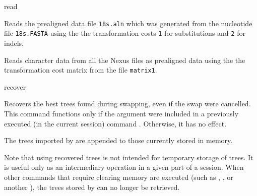 \begin{command}{read}{}
\begin{poyexamples}
{Reads the prealigned data file \texttt{18s.aln} which was generated from the nucleotide file \texttt{18s.FASTA}
using the the transformation costs \texttt{1} for substitutions and \texttt{2} for indels.}

{Reads character data from all the Nexus files as prealigned data using the the transformation cost
matrix from the file \texttt{matrix1}.}

\end{poyexamples}

\begin{poyalso}
\end{poyalso}

\end{command}


\begin{command}{recover}{}
\syntax{\obligatory{()}}

\begin{poydescription}
Recovers the best trees found during swapping, even if the swap were
cancelled. This command functions only if the argument  
were included in a previously executed 
(in the current \poy session) command . Otherwise, it has no effect.

The trees imported by  are appended to those currently
stored in memory.

Note that using recovered trees is not intended for temporary storage of trees.
It is useful only as an intermediary operation in a given part of a \poy session. When
other commands that require clearing memory are executed (such as
, , or another
),
the trees stored by  can no longer be retrieved.

\end{poydescription}

\begin{poyexamples}
\end{poyexamples}

\begin{poyalso}
\end{poyalso}
\end{command}

